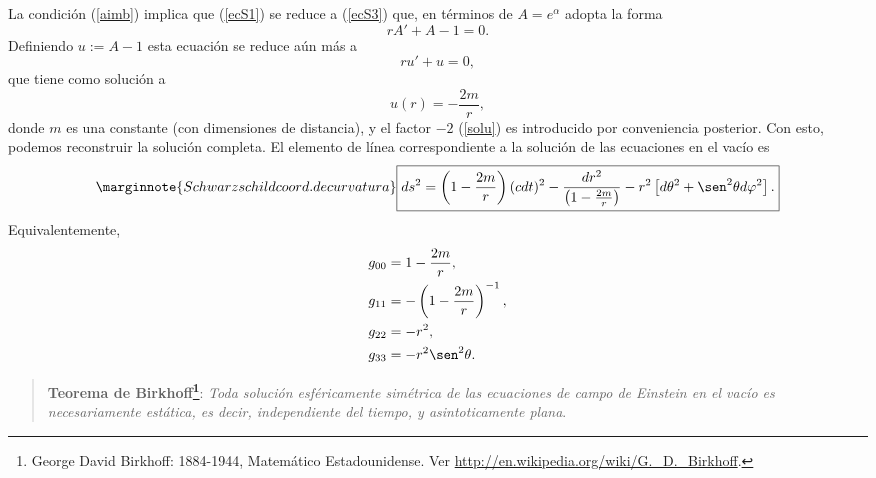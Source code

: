 La condición (\ref{aimb}) implica que (\ref{ecS1}) se reduce a (\ref{ecS3})
que, en términos de $A=e^{\alpha}$ adopta la forma
\begin{equation}
 rA'+A-1=0.
\end{equation}
Definiendo $u:=A-1$ esta ecuación se reduce aún más a
\begin{equation}
 ru'+u=0,
\end{equation}
que tiene como solución a
\begin{equation}
 u(r)=-\frac{2m}{r}, \label{solu}
\end{equation}
donde $m$ es una constante (con dimensiones de distancia), y el factor $-2$
 (\ref{solu}) es introducido por conveniencia posterior. Con esto,
podemos reconstruir la solución completa. El elemento de línea correspondiente
a la solución de las ecuaciones en el vacío es
\begin{equation}\marginnote{Schwarzschild coord. de curvatura}
\boxed{ds^2=\left( 1-\frac{2m}{r}\right) (cdt)^2-\frac{dr^2}{\left( 1-\frac
{2m}{r}\right) }-r^2\left[ d\theta^2+\sen^2\theta d\varphi^2\right].}
\label{Sch}
\end{equation}
Equivalentemente,
\begin{align}
g_{00} & =1-\frac{2m}{r},\\
g_{11} & =-\left( 1-\frac{2m}{r}\right) ^{-1},\\
g_{22} & =-r^2,\\
g_{33} & =-r^2\sen^2\theta.
\end{align}
\begin{quotation}
\textbf{Teorema de Birkhoff\footnote{George David Birkhoff: 1884-1944, Matemático Estadounidense. Ver \url{http://en.wikipedia.org/wiki/G._D._Birkhoff}.}}: \textit{Toda solución esféricamente simétrica de las ecuaciones de campo de Einstein en el vacío es necesariamente estática, es decir, independiente del tiempo, y asintoticamente plana}.
\end{quotation}

